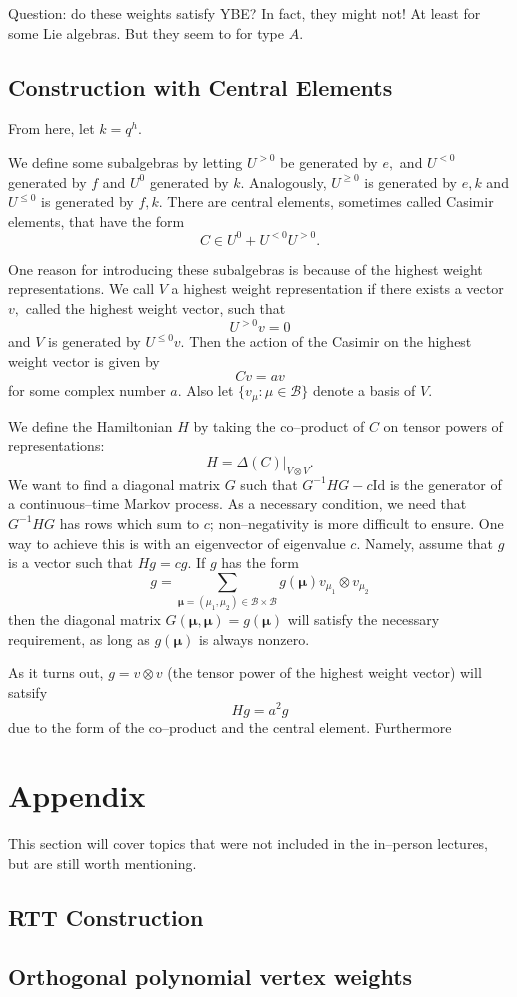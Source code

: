 \documentclass{ximera}
\begin{document}
Question: do these weights satisfy YBE? In fact, they might not! At least
for some Lie algebras. But they seem to for type $A.$

\subsection{Construction with Central Elements}
From here, let $k=q^h.$

We define some subalgebras by letting $U^{> 0}$ be generated by $e,$ and $U^{<0}$ generated by $f$ and
$U^0$ generated by $k$. Analogously, $U^{\geq 0}$ is generated by $e,k$ and $U^{\leq 0}$ is generated
by $f,k$. There are central elements, sometimes called Casimir elements, that have the form
$$
C \in U^0 + U^{< 0}U^{> 0}.
$$

One reason for introducing these subalgebras is because of the highest weight representations. We call $V$ a 
highest weight representation if there exists a vector $v,$ called the highest weight vector, such that
$$
U^{>0}v=0
$$
and $V$ is generated by $U^{\leq 0}v.$ Then the action of the Casimir on the highest weight vector is given by
$$
Cv = av
$$
for some complex number $a.$ Also let $\{v_{\mu}:\mu \in\mathcal{B}\}$ denote a basis of $V.$

We define the Hamiltonian $H$ by taking the co--product of $C$ on tensor powers of representations: 
$$
H = \Delta(C) \vert_{V \otimes V}.
$$
We want to find a diagonal matrix $G$ such that $G^{-1}HG-c\mathrm{Id}$ is the generator of a continuous--time
Markov process. As a necessary condition, we need that $G^{-1}HG$ has rows which sum to $c$; non--negativity is more
difficult to ensure. One way to achieve this is with an eigenvector of eigenvalue $c$. Namely, assume that 
$g$ is a vector such that $Hg=cg.$ If $g$ has the form
$$
g=\sum_{\boldsymbol{\mu}=(\mu_1,\mu_2)\in \mathcal{B}\times \mathcal{B}} g(\boldsymbol{\mu}) v_{\mu_1}\otimes v_{\mu_2} 
$$
then the diagonal matrix $G(\boldsymbol{\mu},\boldsymbol{\mu})=g(\boldsymbol{\mu})$ will satisfy the necessary requirement, 
as long as $g(\boldsymbol{\mu})$ is always nonzero.

As it turns out, $g=v\otimes v$ (the tensor power of the highest weight vector) will satsify 
\[
Hg=a^2g
\]
due to the form of the co--product and the central element. Furthermore

\section{Appendix}

This section will cover topics that were not included in the in--person lectures, but are still worth mentioning.

\subsection{RTT Construction}



\subsection{Orthogonal polynomial vertex weights}
\end{document}
